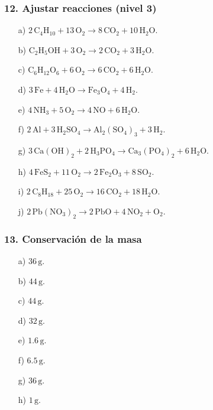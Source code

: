 \subsubsection*{12. Ajustar reacciones (nivel 3)}
\begin{enumerate}
    \item[a)] $2\,\mathrm{C_4H_{10}}+13\,\mathrm{O_2}\rightarrow
    8\,\mathrm{CO_2}+10\,\mathrm{H_2O}$.
    \item[b)] $\mathrm{C_2H_5OH}+3\,\mathrm{O_2}\rightarrow
    2\,\mathrm{CO_2}+3\,\mathrm{H_2O}$.
    \item[c)] $\mathrm{C_6H_{12}O_6}+6\,\mathrm{O_2}\rightarrow
    6\,\mathrm{CO_2}+6\,\mathrm{H_2O}$.
    \item[d)] $3\,\mathrm{Fe}+4\,\mathrm{H_2O}\rightarrow
    \mathrm{Fe_3O_4}+4\,\mathrm{H_2}$.
    \item[e)] $4\,\mathrm{NH_3}+5\,\mathrm{O_2}\rightarrow
    4\,\mathrm{NO}+6\,\mathrm{H_2O}$.
    \item[f)] $2\,\mathrm{Al}+3\,\mathrm{H_2SO_4}\rightarrow
    \mathrm{Al_2(SO_4)_3}+3\,\mathrm{H_2}$.
    \item[g)] $3\,\mathrm{Ca(OH)_2}+2\,\mathrm{H_3PO_4}\rightarrow
    \mathrm{Ca_3(PO_4)_2}+6\,\mathrm{H_2O}$.
    \item[h)] $4\,\mathrm{FeS_2}+11\,\mathrm{O_2}\rightarrow
    2\,\mathrm{Fe_2O_3}+8\,\mathrm{SO_2}$.
    \item[i)] $2\,\mathrm{C_8H_{18}}+25\,\mathrm{O_2}\rightarrow
    16\,\mathrm{CO_2}+18\,\mathrm{H_2O}$.
    \item[j)] $2\,\mathrm{Pb(NO_3)_2}\rightarrow
    2\,\mathrm{PbO}+4\,\mathrm{NO_2}+\mathrm{O_2}$.
\end{enumerate}

\subsubsection*{13. Conservación de la masa}
\begin{enumerate}
    \item[a)] $36\,\mathrm{g}$.
    \item[b)] $44\,\mathrm{g}$.
    \item[c)] $44\,\mathrm{g}$.
    \item[d)] $32\,\mathrm{g}$.
    \item[e)] $1.6\,\mathrm{g}$.
    \item[f)] $6.5\,\mathrm{g}$.
    \item[g)] $36\,\mathrm{g}$.
    \item[h)] $1\,\mathrm{g}$.
\end{enumerate}

